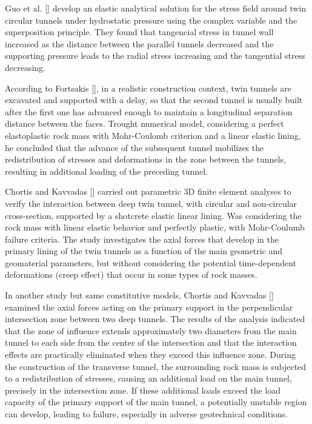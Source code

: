 \documentclass[a4paper,fleqn]{cas-sc}
\begin{document}
Guo et al. [] develop an elastic analytical solution for the stress field around twin circular tunnels under hydrostatic pressure using the complex variable and the superposition principle. They found that tangencial stress in tunnel wall increased as the distance between the parallel tunnels decreased and the supporting pressure leads to the radial stress increasing and the tangential stress decreasing.

According to Fortsakis [], in a realistic construction context, twin tunnels are excavated and supported with a delay, so that the second tunnel is usually built after the first one has advanced enough to maintain a longitudinal separation distance between the faces. Trought numerical model, considering a perfect elastoplastic rock mass with Mohr-Coulomb criterion and a linear elastic lining, he concluded that the advance of the subsequent tunnel mobilizes the redistribution of stresses and deformations in the zone between the tunnels, resulting in additional loading of the preceding tunnel. 

Chortis and Kavvadas [] carried out parametric 3D finite element analyses to verify the interaction between deep twin tunnel, with circular and non-circular cross-section, supported by a shotcrete elastic linear lining. Was considering the rock mass with linear elastic behavior and perfectly plastic, with Mohr-Coulumb failure criteria. The study investigates the axial forces that develop in the primary lining of the twin tunnels as a function of the main geometric and geomaterial parameters, but without considering the potential time-dependent deformations (creep effect) that occur in some types of rock masses.

In another study but same constitutive models, Chortis and Kavvadas [] examined the axial forces acting on the primary support in the perpendicular intersection zone between two deep tunnels. The results of the analysis indicated that the zone of influence extends approximately two diameters from the main tunnel to each side from the center of the intersection and that the interaction effects are practically eliminated when they exceed this influence zone. During the construction of the transverse tunnel, the surrounding rock mass is subjected to a redistribution of stresses, causing an additional load on the main tunnel, precisely in the intersection zone. If these additional loads exceed the load capacity of the primary support of the main tunnel, a potentially unstable region can develop, leading to failure, especially in adverse geotechnical conditions. 
\end{document}
